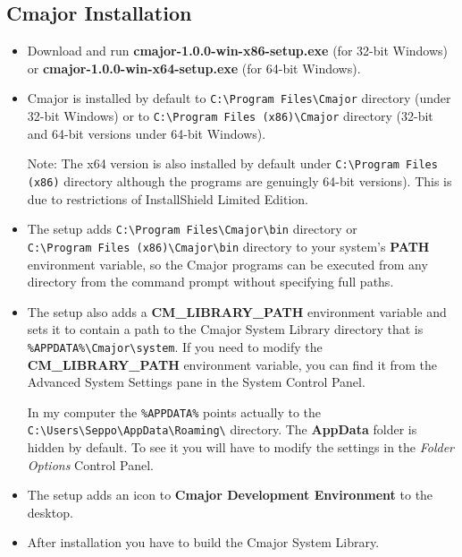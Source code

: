 \documentclass[oneside, a4paper, 11pt]{article}
\begin{document}
\subsection{Cmajor Installation}

\begin{itemize}

\item
Download and run \textbf{cmajor-1.0.0-win-x86-setup.exe} (for 32-bit Windows) or
\textbf{cmajor-1.0.0-win-x64-setup.exe} (for 64-bit Windows).

\item
Cmajor is installed by default to \verb|C:\Program Files\Cmajor| directory (under 32-bit Windows) or
to \verb|C:\Program Files (x86)\Cmajor| directory (32-bit and 64-bit versions under 64-bit Windows).

Note: The x64 version is also installed by default under
\verb|C:\Program Files (x86)| directory although the programs are genuingly 64-bit versions).
This is due to restrictions of InstallShield Limited Edition.

\item
The setup adds \verb|C:\Program Files\Cmajor\bin| directory or \\
\verb|C:\Program Files (x86)\Cmajor\bin| directory
to your system's \textbf{PATH} environment variable, so the Cmajor programs can be executed from any
directory from the command prompt without specifying full paths.

\item
The setup also adds a \textbf{CM\_LIBRARY\_PATH} environment variable and
sets it to contain a path to the Cmajor System Library directory
that is \verb|%APPDATA%\Cmajor\system|. If you need to modify the
\textbf{CM\_LIBRARY\_PATH} environment variable, you can find it from the Advanced System Settings pane in the System Control Panel.

In my computer the \verb|%APPDATA%| points actually to the
\verb|C:\Users\Seppo\AppData\Roaming\| directory. The \textbf{AppData} folder
is hidden by default. To see it you will have to modify the settings in
the \emph{Folder Options} Control Panel.

\item
The setup adds an icon to \textbf{Cmajor Development Environment} to the desktop.

\item
After installation you have to build the Cmajor System Library.


\end{itemize}
\end{document}
